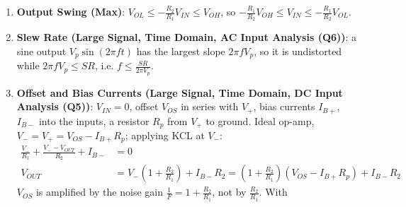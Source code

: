 \begin{enumerate}
    \paragraph{At Input:} \(V_- = -\frac{V_{out}}{A} \to 0\) (virtual ground), so the source sees \(G_1\) to ground:
    \begin{align*}
      I_{in} &= (V_{in} - 0) G_1 \hspace{1cm} \Rightarrow \hspace{1cm} Z_{in} = \frac{V_{in}}{I_{in}} = \frac{1}{G_1} = R_1
    \end{align*}
    \paragraph{At Output:} \(V_{in} = 0\), test voltage \(V_{test}\) at the output, op-amp output
    resistance \(R_o\) in series with its source \(-A V_-\), \(V_- = F V_{test}\) (\(R_1 + R_2 \gg R_o\)):
    \begin{align*}
      I_{test} &= \frac{V_{test} - (-A F V_{test})}{R_o} = \frac{V_{test}(1 + AF)}{R_o} \hspace{1cm}
      Z_{out} = \frac{V_{test}}{I_{test}} = \frac{R_o}{1 + AF}
    \end{align*}
  \item \textbf{Output Swing (Max)}: \(V_{OL} \leq -\frac{R_2}{R_1} V_{IN} \leq V_{OH}\), so
    \(-\frac{R_1}{R_2} V_{OH} \leq V_{IN} \leq -\frac{R_1}{R_2} V_{OL}\).
  \item \textbf{Slew Rate (Large Signal, Time Domain, AC Input Analysis (Q6))}: a sine output
    \(V_p \sin(2\pi f t)\) has the largest slope \(2\pi f V_p\), so it is undistorted while
    \(2\pi f V_p \leq SR\), i.e. \(f \leq \frac{SR}{2\pi V_p}\).
  \item \textbf{Offset and Bias Currents (Large Signal, Time Domain, DC Input Analysis (Q5))}: \(V_{IN} = 0\),
    offset \(V_{OS}\) in series with \(V_+\), bias currents \(I_{B+}\), \(I_{B-}\) into the inputs, a resistor \(R_p\) from
    \(V_+\) to ground. Ideal op-amp, \(V_- = V_+ = V_{OS} - I_{B+} R_p\); applying KCL at \(V_-\):
    \begin{align*}
      \frac{V_-}{R_1} + \frac{V_- - V_{OUT}}{R_2} + I_{B-} &= 0 \\
      V_{OUT} &= V_-\left(1 + \frac{R_2}{R_1}\right) + I_{B-} R_2 = \left(1 + \frac{R_2}{R_1}\right)(V_{OS} - I_{B+} R_p) + I_{B-} R_2
    \end{align*}
    \(V_{OS}\) is amplified by the noise gain \(\frac{1}{F} = 1 + \frac{R_2}{R_1}\), not by \(\frac{R_2}{R_1}\). With

\end{enumerate}
